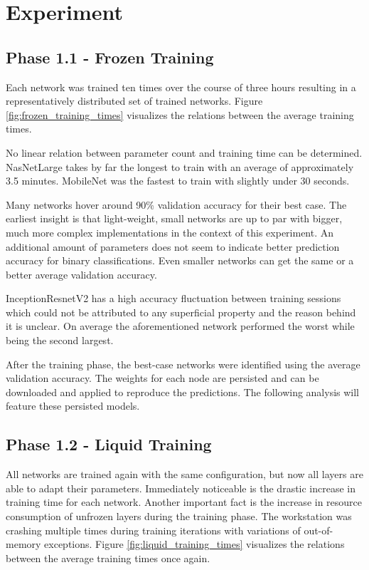
\section{Experiment}
\subsection{Phase 1.1 - Frozen Training}

Each network was trained ten times over the course of three hours resulting in a representatively distributed set of trained networks.
Figure \ref{fig:frozen_training_times} visualizes the relations between the average training times.



No linear relation between parameter count and training time can be determined.
NasNetLarge takes by far the longest to train with an average of approximately 3.5 minutes. 
MobileNet was the fastest to train with slightly under 30 seconds.





Many networks hover around 90\% validation accuracy for their best case.
The earliest insight is that light-weight, small networks are up to par with bigger, much more complex implementations in the context of this experiment.
An additional amount of parameters does not seem to indicate better prediction accuracy for binary classifications.
Even smaller networks can get the same or a better average validation accuracy.

InceptionResnetV2 has a high accuracy fluctuation between training sessions which could not be attributed to any superficial property and the reason behind it is unclear.
On average the aforementioned network performed the worst while being the second largest.

After the training phase, the best-case networks were identified using the average validation accuracy.
The weights for each node are persisted and can be downloaded and applied to reproduce the predictions.
The following analysis will feature these persisted models.


\subsection{Phase 1.2 - Liquid Training}
All networks are trained again with the same configuration, but now all layers are able to adapt their parameters.
Immediately noticeable is the drastic increase in training time for each network.
Another important fact is the increase in resource consumption of unfrozen layers during the training phase.
The workstation was crashing multiple times during training iterations with variations of out-of-memory exceptions.
Figure \ref{fig:liquid_training_times} visualizes the relations between the average training times once again.


